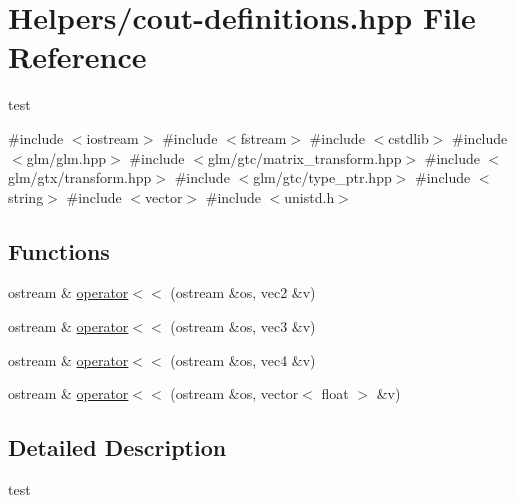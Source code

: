 \hypertarget{cout-definitions_8hpp}{}\section{Helpers/cout-\/definitions.hpp File Reference}
\label{cout-definitions_8hpp}


test  


{\ttfamily \#include $<$iostream$>$}\newline
{\ttfamily \#include $<$fstream$>$}\newline
{\ttfamily \#include $<$cstdlib$>$}\newline
{\ttfamily \#include $<$glm/glm.\+hpp$>$}\newline
{\ttfamily \#include $<$glm/gtc/matrix\+\_\+transform.\+hpp$>$}\newline
{\ttfamily \#include $<$glm/gtx/transform.\+hpp$>$}\newline
{\ttfamily \#include $<$glm/gtc/type\+\_\+ptr.\+hpp$>$}\newline
{\ttfamily \#include $<$string$>$}\newline
{\ttfamily \#include $<$vector$>$}\newline
{\ttfamily \#include $<$unistd.\+h$>$}\newline
\subsection*{Functions}
\begin{DoxyCompactItemize}
\item 
ostream \& \mbox{\hyperlink{cout-definitions_8hpp_a423721485bc58bbd87f25262fc5748b7}{operator$<$$<$}} (ostream \&os, vec2 \&v)
\item 
ostream \& \mbox{\hyperlink{cout-definitions_8hpp_a9785ea3eade9968a62d5e9836f720617}{operator$<$$<$}} (ostream \&os, vec3 \&v)
\item 
ostream \& \mbox{\hyperlink{cout-definitions_8hpp_aced74fdd5c32b973692a20e6272a5f56}{operator$<$$<$}} (ostream \&os, vec4 \&v)
\item 
ostream \& \mbox{\hyperlink{cout-definitions_8hpp_a337249c538c5d8304a68a31ecc936c81}{operator$<$$<$}} (ostream \&os, vector$<$ float $>$ \&v)
\end{DoxyCompactItemize}


\subsection{Detailed Description}
test 

